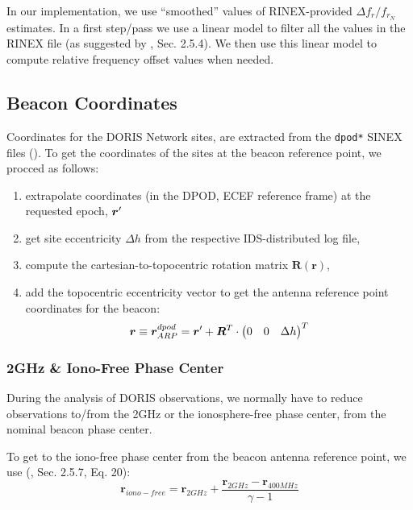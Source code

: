 In our implementation, we use ``smoothed'' values of RINEX-provided 
$\Delta f_r / f_{r_N}$ estimates. In a first step/pass we use a linear model 
to filter all the values in the RINEX file (as suggested by \cite{lemoine-2016}, 
Sec. 2.5.4). We then use this linear model to compute relative frequency offset 
values when needed. 

\subsection{Beacon Coordinates}
\label{ssec:beacon_coordinates}
Coordinates for the DORIS Network sites, are extracted from the \texttt{dpod*} 
SINEX files (\cite{Moreaux2020}). To get the coordinates of the sites at the 
beacon reference point, we procced as follows:
\begin{enumerate}
  \item extrapolate coordinates (in the DPOD, ECEF reference frame) at the 
    requested epoch, $\bm{r}\sp{\prime}$
  \item get site eccentricity $\Delta h$ from the respective IDS-distributed 
    log file,
  \item compute the cartesian-to-topocentric rotation matrix $\bm{R}(\bm{r})$,
  \item add the topocentric eccentricity vector to get the antenna reference
    point coordinates for the beacon:
    \begin{equation}
      \bm{r} \equiv \bm{r}^{dpod}_{ARP} = 
        \bm{r}\sp{\prime} + \bm{R}^T \cdot 
          \begin{pmatrix} 0 & 0 & \Delta h \end{pmatrix}^T
    \end{equation}
\end{enumerate}

\subsubsection{2GHz \& Iono-Free Phase Center}
\label{sssec:2ghz-ionofree-pco}
During the analysis of DORIS observations, we normally have to reduce 
observations to/from the 2GHz or the ionosphere-free phase center, from the 
nominal beacon phase center.

To get to the iono-free phase center from the beacon antenna reference point, 
we use (\cite{lemoine-2016}, Sec. 2.5.7, Eq. 20):
\begin{equation}
  \bm{r}_{iono-free} = \bm{r}_{2GHz} + \frac{\bm{r}_{2GHz} 
    - \bm{r}_{400MHz}}{\gamma -1}
  \label{eq:ionf-pco}
\end{equation}

